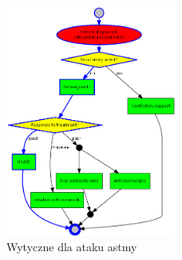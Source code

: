 \begin{figure}[H]
\centering
\includegraphics[width=0.5\textwidth]{img/asthma.png}
\caption{Wytyczne dla ataku astmy}
\label{fig:ag_ae}
\end{figure}

